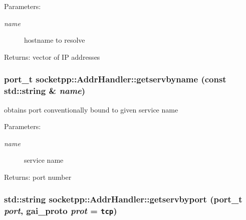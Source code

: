 \begin{Desc}
\item[Parameters:]
\begin{description}
\item[{\em name}]hostname to resolve \end{description}
\end{Desc}
\begin{Desc}
\item[Returns:]vector of IP addresses \end{Desc}
\hypertarget{classsocketpp_1_1AddrHandler_aa24239225e2a35cce9322dfa68bf438}{
\subsubsection[{getservbyname}]{\setlength{\rightskip}{0pt plus 5cm}port\_\-t socketpp::AddrHandler::getservbyname (const std::string \& {\em name})}}
\label{classsocketpp_1_1AddrHandler_aa24239225e2a35cce9322dfa68bf438}


obtains port conventionally bound to given service name 

\begin{Desc}
\item[Parameters:]
\begin{description}
\item[{\em name}]service name \end{description}
\end{Desc}
\begin{Desc}
\item[Returns:]port number \end{Desc}
\hypertarget{classsocketpp_1_1AddrHandler_c099c4bdf0b45e5d4a1e5806d896768e}{
\subsubsection[{getservbyport}]{\setlength{\rightskip}{0pt plus 5cm}std::string socketpp::AddrHandler::getservbyport (port\_\-t {\em port}, \/  gai\_\-proto {\em prot} = {\tt tcp})}}
\label{classsocketpp_1_1AddrHandler_c099c4bdf0b45e5d4a1e5806d896768e}


